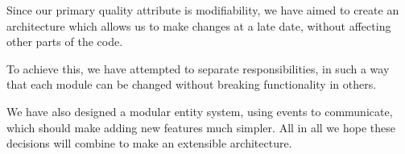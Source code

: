 Since our primary quality attribute is modifiability, we have aimed to create 
an architecture which allows us to make changes at a late date, without
affecting other parts of the code.

To achieve this, we have attempted to separate responsibilities, in such a way
that each module can be changed without breaking functionality in others.

We have also designed a modular entity system, using events to communicate, 
which should make adding new features much simpler.  All in all we hope these 
decisions will combine to make an extensible architecture.